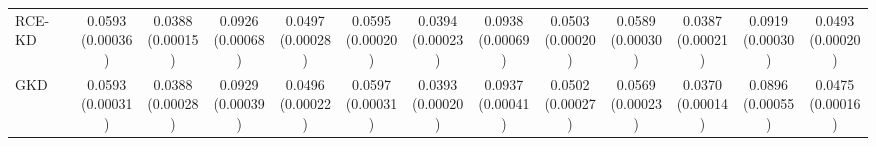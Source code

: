 \begin{table}[t]
\begin{tabular}{lcccccccccccc}
RCE-KD & \shortstack[c]{0.0593\\[-1pt]{\tiny(0.00036)}} & \shortstack[c]{0.0388\\[-1pt]{\tiny(0.00015)}} & \shortstack[c]{0.0926\\[-1pt]{\tiny(0.00068)}} & \shortstack[c]{0.0497\\[-1pt]{\tiny(0.00028)}} & \shortstack[c]{0.0595\\[-1pt]{\tiny(0.00020)}} & \shortstack[c]{0.0394\\[-1pt]{\tiny(0.00023)}} & \shortstack[c]{0.0938\\[-1pt]{\tiny(0.00069)}} & \shortstack[c]{0.0503\\[-1pt]{\tiny(0.00020)}} & \shortstack[c]{0.0589\\[-1pt]{\tiny(0.00030)}} & \shortstack[c]{0.0387\\[-1pt]{\tiny(0.00021)}} & \shortstack[c]{0.0919\\[-1pt]{\tiny(0.00030)}} & \shortstack[c]{0.0493\\[-1pt]{\tiny(0.00020)}} \\
GKD & \shortstack[c]{0.0593\\[-1pt]{\tiny(0.00031)}} & \shortstack[c]{0.0388\\[-1pt]{\tiny(0.00028)}} & \shortstack[c]{0.0929\\[-1pt]{\tiny(0.00039)}} & \shortstack[c]{0.0496\\[-1pt]{\tiny(0.00022)}} & \shortstack[c]{0.0597\\[-1pt]{\tiny(0.00031)}} & \shortstack[c]{0.0393\\[-1pt]{\tiny(0.00020)}} & \shortstack[c]{0.0937\\[-1pt]{\tiny(0.00041)}} & \shortstack[c]{0.0502\\[-1pt]{\tiny(0.00027)}} & \shortstack[c]{0.0569\\[-1pt]{\tiny(0.00023)}} & \shortstack[c]{0.0370\\[-1pt]{\tiny(0.00014)}} & \shortstack[c]{0.0896\\[-1pt]{\tiny(0.00055)}} & \shortstack[c]{0.0475\\[-1pt]{\tiny(0.00016)}} \\

\end{tabular}
\end{table}
